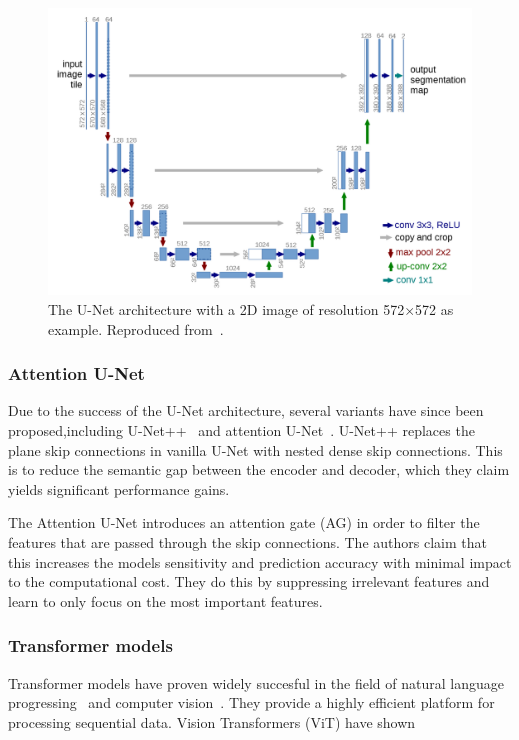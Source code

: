 \begin{figure}
    \centering
    \includegraphics[width=1\linewidth]{media/images/UNet_arch.png}
    \caption{The U-Net architecture with a 2D image of resolution 572$\times$572 as example. Reproduced from~\cite{Ronneberger_Fischer_Brox_2015}.}
    \label{fig:unet_arch}
  \end{figure}

\subsubsection{Attention U-Net}

Due to the success of the U-Net architecture, several variants have since been proposed,including U-Net++~\cite{Zhou_2018_unet++} and attention U-Net~\cite{Oktay_2018_AUNet}. U-Net++
replaces the plane skip connections in vanilla U-Net with nested dense skip connections. This is to reduce the semantic gap between the encoder and decoder, which they claim yields significant performance gains.

The Attention U-Net introduces an attention gate (AG) in order to filter the features that are passed through the skip connections. The authors claim that this increases the models sensitivity and prediction accuracy with minimal impact to the computational cost. They do this by suppressing irrelevant features and learn to only focus on the most important features. 


\subsubsection{Transformer models}

Transformer models have proven widely succesful in the field of natural language progressing~\cite{Vaswani_2017_transformer} and computer vision~\cite{Dosovitskiy_2021_vit}. They provide a highly efficient platform for processing sequential data. Vision Transformers (ViT) have shown 

